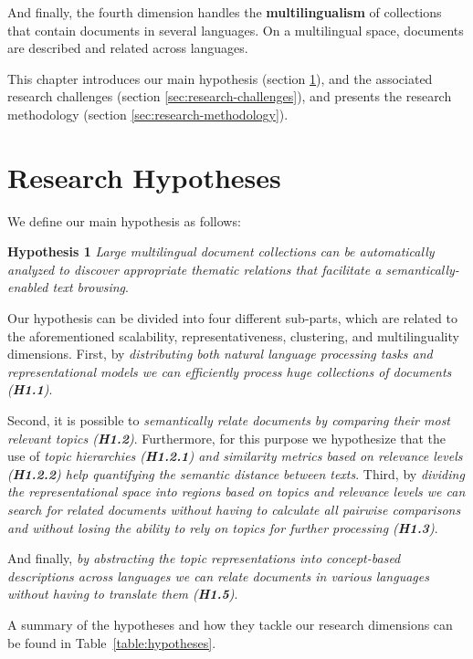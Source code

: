 And finally, the fourth dimension handles the \textbf{multilingualism} of collections that contain documents in several languages. On a multilingual space, documents are described and related across languages.

This chapter introduces our main hypothesis (section \ref{sec:research-hypothesis}), and the associated research challenges (section \ref{sec:research-challenges}), and presents the research methodology (section \ref{sec:research-methodology}).

\section{Research Hypotheses}\label{sec:research-hypothesis}

We define our main hypothesis as follows:

\textbf{Hypothesis 1} \textit{Large multilingual document collections can be automatically analyzed to discover appropriate thematic relations that facilitate a semantically-enabled text browsing}.

Our hypothesis can be divided into four different sub-parts, which are related to the aforementioned scalability, representativeness, clustering, and multilinguality dimensions. First, by \textit{distributing both natural language processing tasks and representational models we can efficiently process huge collections of documents (\textbf{H1.1})}.

Second, it is possible to \textit{semantically relate documents by comparing their most relevant topics (\textbf{H1.2})}. Furthermore, for this purpose we hypothesize that the use of \textit{topic hierarchies (\textbf{H1.2.1}) and similarity metrics based on relevance levels (\textbf{H1.2.2}) help quantifying the semantic distance between texts}. Third, by \textit{dividing the representational space into regions based on topics and relevance levels we can search for related documents without having to calculate all pairwise comparisons and without losing the ability to rely on topics for further processing (\textbf{H1.3})}.

And finally, \textit{by abstracting the topic representations into concept-based descriptions across languages we can relate documents in various languages without having to translate them (\textbf{H1.5})}.

A summary of the hypotheses and how they tackle our research dimensions can be found in Table~\ref{table:hypotheses}.

